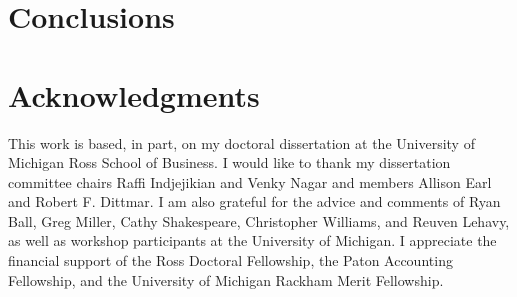 \documentclass{article}
\begin{document}
\section{Conclusions}\label{conclusions}

\section*{Acknowledgments} 
 
This work is based, in part, on my doctoral dissertation at the University of Michigan Ross School of Business. I would like to thank my dissertation committee chairs Raffi Indjejikian and Venky Nagar and members Allison Earl and Robert F. Dittmar. I am also grateful for the advice and comments of Ryan Ball, Greg Miller, Cathy Shakespeare, Christopher Williams, and Reuven Lehavy, as well as workshop participants at the University of Michigan. I appreciate the financial support of the Ross Doctoral Fellowship, the Paton Accounting Fellowship, and the University of Michigan Rackham Merit Fellowship.



\end{document}
